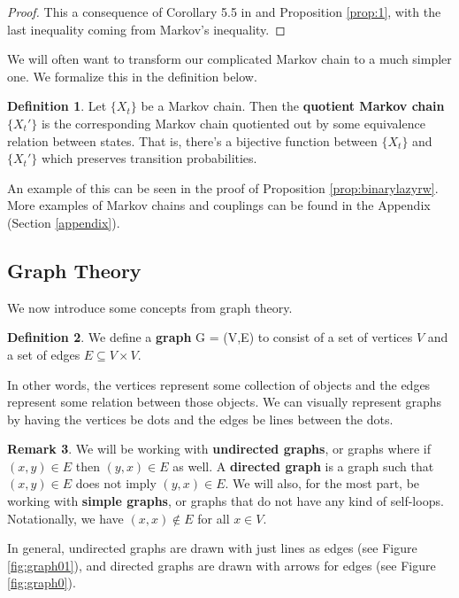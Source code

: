 \documentclass[10pt,a4paper]{amsart}
\theoremstyle{definition}
\newtheorem{definition}{Definition}
\numberwithin{definition}{section}
\newtheorem{remark}[definition]{Remark}
\begin{document}
\begin{proof}
This a consequence of Corollary 5.5 in \cite{LevinPeresWilmer2006} and Proposition \ref{prop:1}, with the last inequality coming from Markov's inequality.
\end{proof}

We will often want to transform our complicated Markov chain to a much simpler one. We formalize this in the definition below.

\begin{definition}
Let $\{X_t\}$ be a Markov chain. Then the \textbf{quotient Markov chain} $\{X_t'\}$ is the corresponding Markov chain quotiented out by some equivalence relation between states. That is, there's a bijective function between $\{X_t\}$ and $\{X_t'\}$ which preserves transition probabilities. 
\end{definition}

An example of this can be seen in the proof of Proposition \ref{prop:binarylazyrw}. More examples of Markov chains and couplings can be found in the Appendix (Section \ref{appendix}).

\subsection{Graph Theory} \label{subsec:gt}
We now introduce some concepts from graph theory. 
\begin{definition}
We define a \textbf{graph} G = (V,E) to consist of a set of vertices $V$ and a set of edges $E \subseteq V \times V$.
\end{definition}
\noindent In other words, the vertices represent some collection of objects and the edges represent some relation between those objects. We can visually represent graphs by having the vertices be dots and the edges be lines between the dots. 
\begin{remark}
We will be working with \textbf{undirected graphs}, or graphs where if $(x,y) \in E$ then $(y,x) \in E$ as well. A \textbf{directed graph} is a graph such that $(x,y) \in E$ does not imply $(y,x) \in E$. We will also, for the most part, be working with \textbf{simple graphs}, or graphs that do not have any kind of self-loops. Notationally, we have $(x,x) \notin E$ for all $x \in V$.
\end{remark}
\noindent In general, undirected graphs are drawn with just lines as edges (see Figure \ref{fig:graph01}), and directed graphs are drawn with arrows for edges (see Figure \ref{fig:graph0}). 
\end{document}
